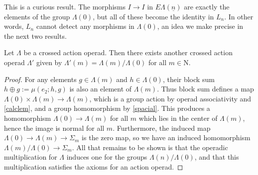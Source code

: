 \documentclass{amsbook} %
\newcommand{\ELn}{E\Lambda(\underline{n})}
\numberwithin{section}{chapter}
\begin{document}
This is a curious result. The morphisms $I \to I$ in $\ELn$ are exactly the elements of the group $\Lambda(0)$, but all of these become the identity in $L_n$. In other words, $L_n$ cannot detect any morphisms in $\Lambda(0)$, an idea we make precise in the next two results. 


\begin{prop} \label{G0quot} Let $\Lambda$ be a crossed action operad. Then there exists another crossed action operad $\Lambda'$ given by $\Lambda'(m) = \Lambda(m)/\Lambda(0)$ for all $m \in \mathrm{N}$.
\end{prop}
\begin{proof}
For any elements $g \in \Lambda(m)$ and $h \in \Lambda(0)$, their block sum $h \oplus g := \mu(e_2; h, g)$ is also an element of $\Lambda(m)$. Thus block sum defines a map $\Lambda(0) \times \Lambda(m) \to \Lambda(m)$, which is a group action by operad associativity and \cref{calclem}, and a group homomorphism by \cref{spacial}. This produces a homomorphism $\Lambda(0) \to \Lambda(m)$ for all $m$ which lies in the center of $\Lambda(m)$, hence the image is normal for all $m$. Furthermore, the induced map $\Lambda(0) \to \Lambda(m) \to \Sigma_m$ is the zero map, so we have an induced homomorphism $\Lambda(m)/\Lambda(0) \to \Sigma_m$. All that remains to be shown is that the operadic multiplication for $\Lambda$ induces one for the groups $\Lambda(n)/\Lambda(0)$, and that this multiplication satisfies the axioms for an action operad.


\end{proof}
\end{document}

